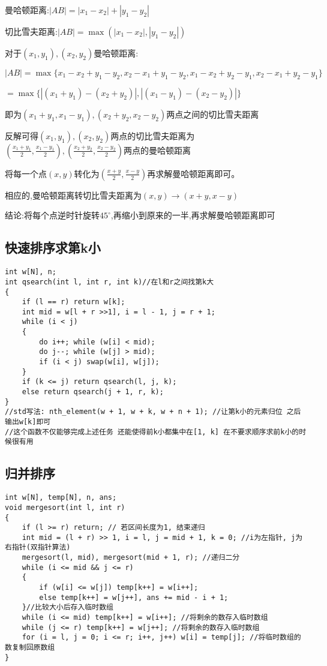 \documentclass[a4paper, fontset=none]{ctexart}
\begin{document}
曼哈顿距离:$|AB|=|x_1-x_2|+|y_1-y_2|$

切比雪夫距离:$|AB |= \max(|x_1-x_2|,|y_1-y_2|)$

对于$(x_1, y_1),(x_2, y_2)$曼哈顿距离:

$|AB |= \max\{x_1-x_2+y_1-y_2, x_2-x_1+y_1-y_2, x_1-x_2+y_2-y_1, x_2-x_1+y_2-y_1\}$

$=\max\{|(x_1+y_1)-(x_2+y_2)|,|(x_1-y_1)-(x_2-y_2)|\}$

即为$(x_1+y_1, x_1-y_1),(x_2+y_2, x_2-y_2)$两点之间的切比雪夫距离

反解可得$(x_1, y_1),(x_2, y_2)$两点的切比雪夫距离为$(\frac{x_1+y_1}{2},\frac{x_1-y_1}{2}),(\frac{x_2+y_2}{2},\frac{x_2-y_2}{2})$两点的曼哈顿距离

将每一个点$(x, y)$转化为$(\frac{x+y}{2},\frac{x-y}{2})$再求解曼哈顿距离即可。

相应的,曼哈顿距离转切比雪夫距离为$(x, y)\rightarrow (x+y, x-y)$

结论:将每个点逆时针旋转$45^\circ$,再缩小到原来的一半,再求解曼哈顿距离即可
\subsection{快速排序求第k小}

\begin{verbatim}
int w[N], n;
int qsearch(int l, int r, int k)//在l和r之间找第k大
{
    if (l == r) return w[k];
    int mid = w[l + r >>1], i = l - 1, j = r + 1;
    while (i < j)
    {
        do i++; while (w[i] < mid);
        do j--; while (w[j] > mid);
        if (i < j) swap(w[i], w[j]);
    }
    if (k <= j) return qsearch(l, j, k);
    else return qsearch(j + 1, r, k);
}
//std写法: nth_element(w + 1, w + k, w + n + 1); //让第k小的元素归位 之后输出w[k]即可
//这个函数不仅能够完成上述任务 还能使得前k小都集中在[1, k] 在不要求顺序求前k小的时候很有用
\end{verbatim}
\subsection{归并排序}

\begin{verbatim}
int w[N], temp[N], n, ans;
void mergesort(int l, int r)
{
    if (l >= r) return; // 若区间长度为1, 结束递归
    int mid = (l + r) >> 1, i = l, j = mid + 1, k = 0; //i为左指针, j为右指针(双指针算法)
    mergesort(l, mid), mergesort(mid + 1, r); //递归二分
    while (i <= mid && j <= r)
    {
        if (w[i] <= w[j]) temp[k++] = w[i++];
        else temp[k++] = w[j++], ans += mid - i + 1;
    }//比较大小后存入临时数组
    while (i <= mid) temp[k++] = w[i++]; //将剩余的数存入临时数组
    while (j <= r) temp[k++] = w[j++]; //将剩余的数存入临时数组
    for (i = l, j = 0; i <= r; i++, j++) w[i] = temp[j]; //将临时数组的数复制回原数组
}
\end{verbatim}
\end{document}
